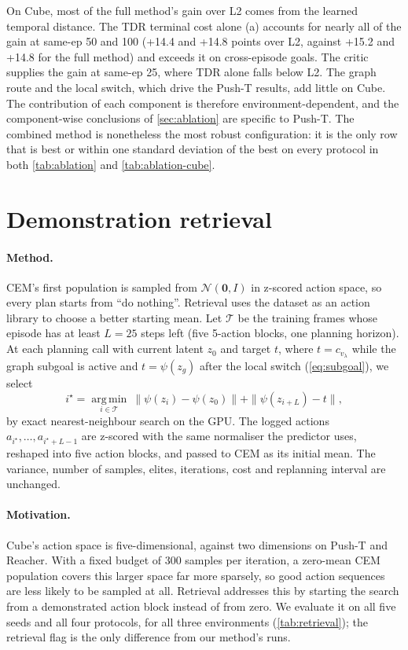\documentclass{article} %
\newcommand{\z}{z}
\newcommand{\psiT}{\psi}
\theoremstyle{definition}
\theoremstyle{remark}
\begin{document}
On Cube, most of the full method's gain over L2 comes from the learned temporal distance. The
TDR terminal cost alone (a) accounts for nearly all of the gain at same-ep 50 and 100 (+14.4 and
+14.8 points over L2, against +15.2 and +14.8 for the full method) and exceeds it on
cross-episode goals. The critic supplies the gain at same-ep 25, where TDR alone falls below L2.
The graph route and the local switch, which drive the Push-T results, add little on Cube. The
contribution of each component is therefore environment-dependent, and the component-wise
conclusions of \cref{sec:ablation} are specific to Push-T. The combined method is nonetheless
the most robust configuration: it is the only row that is best or within one standard deviation
of the best on every protocol in both \cref{tab:ablation} and \cref{tab:ablation-cube}.

\section{Demonstration retrieval}
\label{app:retrieval}

\paragraph{Method.} CEM's first population is sampled from $\mathcal{N}(\mathbf{0}, I)$ in
z-scored action space, so every plan starts from ``do nothing''. Retrieval uses the dataset as an
action library to choose a better starting mean. Let $\mathcal{T}$ be the training frames whose
episode has at least $L=25$ steps left (five 5-action blocks, one planning horizon). At each
planning call with current latent $\z_0$ and target $t$, where $t=c_{v_\lambda}$ while the graph
subgoal is active and $t=\psiT(\z_g)$ after the local switch (\cref{eq:subgoal}), we select
\begin{equation}
  i^\star=\operatorname*{arg\,min}_{i\in\mathcal{T}}\ \|\psiT(\z_i)-\psiT(\z_0)\|+\|\psiT(\z_{i+L})-t\|,
  \label{eq:retrieval}
\end{equation}
by exact nearest-neighbour search on the GPU. The logged actions $a_{i^\star},\dots,a_{i^\star+L-1}$
are z-scored with the same normaliser the predictor uses, reshaped into five action blocks, and
passed to CEM as its initial mean. The variance, number of samples, elites, iterations, cost
and replanning interval are unchanged. 
\paragraph{Motivation.} Cube's action space is five-dimensional, against two dimensions on
Push-T and Reacher. With a fixed budget of 300 samples per iteration, a zero-mean CEM population
covers this larger space far more sparsely, so good action sequences are less likely to be
sampled at all. Retrieval addresses this by starting the search from a demonstrated action
block instead of from zero. We evaluate it on all five seeds and all four protocols, for all
three environments (\cref{tab:retrieval}); the retrieval flag is the only difference from our
method's runs.
\end{document}

